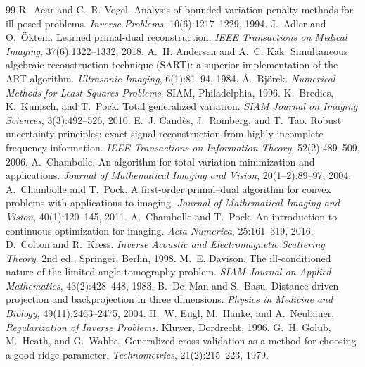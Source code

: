 \documentclass[11pt,a4paper]{article}
\numberwithin{equation}{section}
\theoremstyle{remark}
\begin{document}
\begingroup
\small
\begin{thebibliography}{99}
 R.~Acar and C.~R. Vogel. Analysis of bounded variation penalty methods for ill-posed problems. \emph{Inverse Problems}, 10(6):1217--1229, 1994.
 J.~Adler and O.~{\"O}ktem. Learned primal-dual reconstruction. \emph{IEEE Transactions on Medical Imaging}, 37(6):1322--1332, 2018.
 A.~H. Andersen and A.~C. Kak. Simultaneous algebraic reconstruction technique ({SART}): a superior implementation of the {ART} algorithm. \emph{Ultrasonic Imaging}, 6(1):81--94, 1984.
 {\AA}.~Bj{\"o}rck. \emph{Numerical Methods for Least Squares Problems}. SIAM, Philadelphia, 1996.
 K.~Bredies, K.~Kunisch, and T.~Pock. Total generalized variation. \emph{SIAM Journal on Imaging Sciences}, 3(3):492--526, 2010.
 E.~J. Cand{\`e}s, J.~Romberg, and T.~Tao. Robust uncertainty principles: exact signal reconstruction from highly incomplete frequency information. \emph{IEEE Transactions on Information Theory}, 52(2):489--509, 2006.
 A.~Chambolle. An algorithm for total variation minimization and applications. \emph{Journal of Mathematical Imaging and Vision}, 20(1--2):89--97, 2004.
 A.~Chambolle and T.~Pock. A first-order primal--dual algorithm for convex problems with applications to imaging. \emph{Journal of Mathematical Imaging and Vision}, 40(1):120--145, 2011.
 A.~Chambolle and T.~Pock. An introduction to continuous optimization for imaging. \emph{Acta Numerica}, 25:161--319, 2016.
 D.~Colton and R.~Kress. \emph{Inverse Acoustic and Electromagnetic Scattering Theory}. 2nd ed., Springer, Berlin, 1998.
 M.~E. Davison. The ill-conditioned nature of the limited angle tomography problem. \emph{SIAM Journal on Applied Mathematics}, 43(2):428--448, 1983.
 B.~De~Man and S.~Basu. Distance-driven projection and backprojection in three dimensions. \emph{Physics in Medicine and Biology}, 49(11):2463--2475, 2004.
 H.~W. Engl, M.~Hanke, and A.~Neubauer. \emph{Regularization of Inverse Problems}. Kluwer, Dordrecht, 1996.
 G.~H. Golub, M.~Heath, and G.~Wahba. Generalized cross-validation as a method for choosing a good ridge parameter. \emph{Technometrics}, 21(2):215--223, 1979.

\end{thebibliography}
\end{document}
